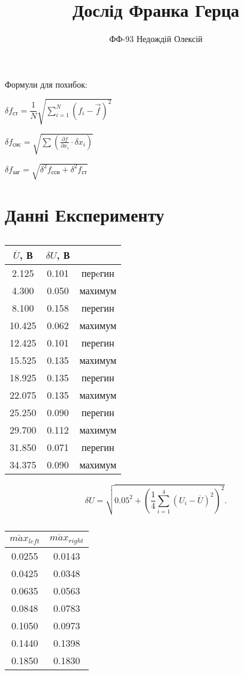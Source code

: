 \documentclass[12pt,a4paper]{article}
\author{ФФ-93 Недождій Олексій}
\date{}
\title{Дослід Франка Герца}
\begin{document}
\maketitle
Формули для похибок:

$\delta f_\text{ст} = \dfrac{1}{N}\sqrt{\sum_{i=1}^{N}(f_i - \vec{f})^{2}}$

$\delta f_\text{сис} = \sqrt{\sum(\frac{\partial f}{\partial x_i} \cdot \delta x_i)}$

$\delta f_\text{заг} = \sqrt{\delta^{2} f_\text{сси} + \delta^{2} f_\text{ст}}$

\section*{Данні Експерименту}

\begin{table}[!h]
    \centering
    \caption{}
    \begin{tabular}{ccc}
        \hline
        $\overline{U}$, В & $\delta U$, В \\
        \hline
        2.125 & 0.101 & перeгин\\
        4.300 & 0.050 & махимум\\
        8.100 & 0.158 & перегин\\
        10.425 & 0.062 & махимум\\
        12.425 & 0.101 & перегин\\
        15.525 & 0.135 & махимум\\
        18.925 & 0.135 & перегин\\
        22.075 & 0.135 & махимум\\
        25.250 & 0.090 & перегин\\
        29.700 & 0.112 & махимум\\
        31.850 & 0.071 & перегин\\
        34.375 &0.090 & махимум\\
    \end{tabular}
\end{table}

\[
    \delta U = \sqrt{0.05^{2} + (\frac{1}{4}\sum_{i=1}^4 (U_i - \overline{U})^{2})^{2}}
.\]

\begin{table}[!h]
    \centering
    \caption{}
    \begin{tabular}{cc}
        \hline
        $\overline{max}_{left}$ & $\overline{max}_{right}$ \\
        \hline
        0.0255 & 0.0143 \\
        0.0425 & 0.0348 \\
        0.0635 & 0.0563 \\
        0.0848 & 0.0783 \\
        0.1050 & 0.0973 \\
        0.1440 & 0.1398 \\
        0.1850 & 0.1830  \\
        \hline
    \end{tabular}
 \end{table}
\end{document}
